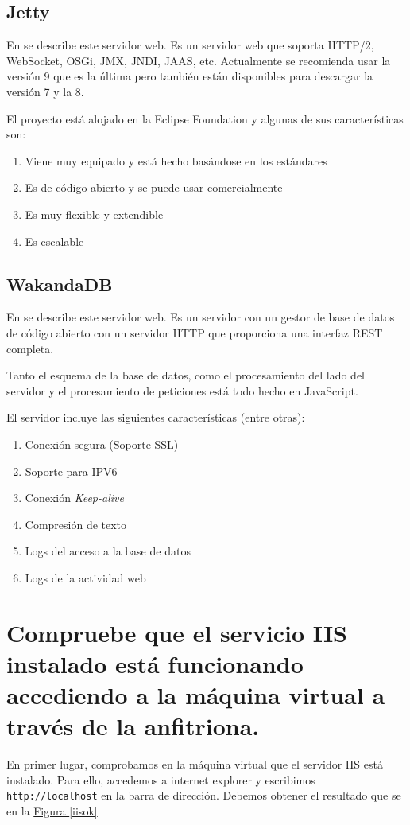 \documentclass[10pt,a4paper,spanish]{article}
\numberwithin{equation}{section} %
\numberwithin{figure}{section} %
\numberwithin{table}{section} %
\begin{document}
\subsection{Jetty}
En \cite{jettyserver} se describe este servidor web. Es un servidor web que soporta HTTP/2, WebSocket, OSGi, JMX, JNDI, JAAS, etc. Actualmente se recomienda usar la versión 9 que es la última pero también están disponibles para descargar la versión 7 y la 8.

El proyecto está alojado en la Eclipse Foundation y algunas de sus características son:
\begin{enumerate}[$\bigstar$]
    \item Viene muy equipado y está hecho basándose en los estándares
    \item Es de código abierto y se puede usar comercialmente
    \item Es muy flexible y extendible
    \item Es escalable
\end{enumerate}

\subsection{WakandaDB}
En \cite{wakandaserver} se describe este servidor web. Es un servidor con un gestor de base de datos de código abierto con un servidor HTTP que proporciona una interfaz REST completa. 

Tanto el esquema de la base de datos, como el procesamiento del lado del servidor y el procesamiento de peticiones está todo hecho en JavaScript.

El servidor incluye las siguientes características (entre otras):
\begin{enumerate}[$\bigstar$]
    \item Conexión segura (Soporte SSL)
    \item Soporte para IPV6
    \item Conexión \textit{Keep-alive}
    \item Compresión de texto
    \item Logs del acceso a la base de datos
    \item Logs de la actividad web
\end{enumerate}

\section{Compruebe que el servicio IIS instalado está funcionando accediendo a la máquina virtual a través de la anfitriona.}
En primer lugar, comprobamos en la máquina virtual que el servidor IIS está instalado. Para ello, accedemos a internet explorer y escribimos \texttt{http://localhost} en la barra de dirección. Debemos obtener el resultado que se en la \hyperref[iisok]{Figura \ref*{iisok}}
\end{document}
